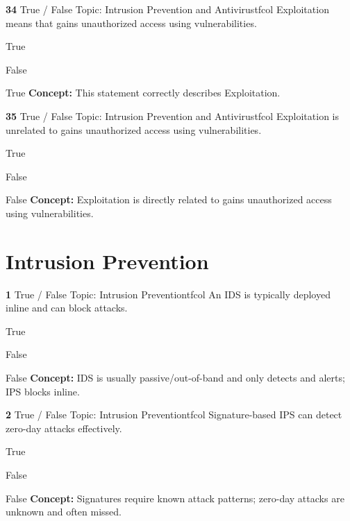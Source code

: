 \documentclass[10pt,a4paper]{article}
\begin{document}
\begin{qcard}{\color{white}\textbf{34} \hfill \small True / False \textbar{} Topic: Intrusion Prevention and Antivirus}{tfcol}
Exploitation means that gains unauthorized access using vulnerabilities.

\begin{qoptions}
\item True
\item False
\end{qoptions}
\begin{explainbox}{True}
\textbf{Concept:} This statement correctly describes Exploitation.
\end{explainbox}
\end{qcard}

\begin{qcard}{\color{white}\textbf{35} \hfill \small True / False \textbar{} Topic: Intrusion Prevention and Antivirus}{tfcol}
Exploitation is unrelated to gains unauthorized access using vulnerabilities.

\begin{qoptions}
\item True
\item False
\end{qoptions}
\begin{explainbox}{False}
\textbf{Concept:} Exploitation is directly related to gains unauthorized access using vulnerabilities.
\end{explainbox}
\end{qcard}

\section{Intrusion Prevention}
\begin{qcard}{\color{white}\textbf{1} \hfill \small True / False \textbar{} Topic: Intrusion Prevention}{tfcol}
An IDS is typically deployed inline and can block attacks.

\begin{qoptions}
\item True
\item False
\end{qoptions}
\begin{explainbox}{False}
\textbf{Concept:} IDS is usually passive/out-of-band and only detects and alerts; IPS blocks inline.
\end{explainbox}
\end{qcard}

\begin{qcard}{\color{white}\textbf{2} \hfill \small True / False \textbar{} Topic: Intrusion Prevention}{tfcol}
Signature-based IPS can detect zero-day attacks effectively.

\begin{qoptions}
\item True
\item False
\end{qoptions}
\begin{explainbox}{False}
\textbf{Concept:} Signatures require known attack patterns; zero-day attacks are unknown and often missed.
\end{explainbox}
\end{qcard}
\end{document}

